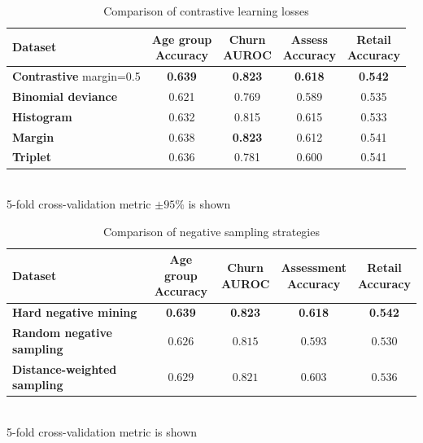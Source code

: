 \documentclass[sigconf]{acmart}
\begin{document}
\begin{table}
\centering
\caption{Comparison of contrastive learning losses}
\begin{tabularx}{\linewidth}{Xcccc}
\toprule
\textbf{Dataset} &
\makecell{\textbf{Age group} \\ \small{Accuracy}} &
\makecell{\textbf{Churn} \\ \small{AUROC}} &
\makecell{\textbf{Assess} \\ \small{Accuracy}} &
\makecell{\textbf{Retail} \\ \small{Accuracy}} \\
\midrule

\textbf{Contrastive} \small{margin=0.5} & \textbf{0.639} & \textbf{0.823} & \textbf{0.618} & \textbf{0.542} \\
\textbf{Binomial deviance} & 0.621 & 0.769 & 0.589 & 0.535 \\
\textbf{Histogram} & 0.632 & 0.815 & 0.615 & 0.533 \\
\textbf{Margin} & 0.638 & \textbf{0.823} & 0.612 & 0.541 \\
\textbf{Triplet} & 0.636 & 0.781 & 0.600 & 0.541 \\

\bottomrule
\end{tabularx} \\
\small{5-fold cross-validation metric $\pm 95\%$ is shown}
\label{tab-loss-type}
\end{table}

\begin{table}
\centering
\caption{Comparison of negative sampling strategies}
\begin{tabularx}{\linewidth}{Xcccc}
\toprule
\textbf{Dataset} &
\makecell{\textbf{Age group} \\ \small{Accuracy}} &
\makecell{\textbf{Churn} \\ \small{AUROC}} &
\makecell{\textbf{Assessment} \\ \small{Accuracy}} &
\makecell{\textbf{Retail} \\ \small{Accuracy}} \\
\midrule

\textbf{Hard negative mining} & \textbf{0.639} & \textbf{0.823} & \textbf{0.618} & \textbf{0.542} \\
\textbf{Random negative sampling} & $0.626$ & $0.815$ & $0.593$ & $0.530$ \\
\textbf{Distance-weighted sampling} & $0.629$ & $0.821$ & $0.603$ & $0.536$ \\

\bottomrule
\end{tabularx} \\
\small{5-fold cross-validation metric is shown}
\label{tab-neg-sampl}
\end{table}
\end{document}
